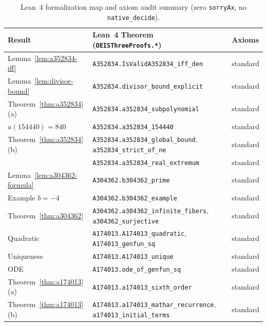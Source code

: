 \documentclass[11pt,a4paper]{article}
\theoremstyle{definition}
\theoremstyle{remark}
\begin{document}
\begin{table}[htbp]
\centering
\caption{Lean~4 formalization map and axiom audit summary (zero \texttt{sorryAx}, no \texttt{native\_decide}).}
\label{tab:lean-audit}
{\footnotesize
\begin{tabular}{@{}lll@{}}
\toprule
Result & Lean~4 Theorem (\texttt{OEISThreeProofs.*}) & Axioms \\
\midrule
Lemma~\ref{lem:a352834-iff} & \texttt{A352834.IsValidA352834\_iff\_den} & standard \\
Lemma~\ref{lem:divisor-bound} & \texttt{A352834.divisor\_bound\_explicit} & standard \\
Theorem~\ref{thm:a352834}(a) & \texttt{A352834.a352834\_subpolynomial} & standard \\
$a(154440)=840$ & \texttt{A352834.a352834\_154440} & standard \\
Theorem~\ref{thm:a352834}(b) & \texttt{A352834.a352834\_global\_bound}, \texttt{a352834\_strict\_of\_ne} & standard \\
 & \texttt{A352834.a352834\_real\_extremum} & standard \\
\midrule
Lemma~\ref{lem:a304362-formula} & \texttt{A304362.b304362\_prime} & standard \\
Example $b=-4$ & \texttt{A304362.b304362\_example} & standard \\
Theorem~\ref{thm:a304362} & \texttt{A304362.a304362\_infinite\_fibers}, \texttt{a304362\_surjective} & standard \\
\midrule
Quadratic & \texttt{A174013.A174013\_quadratic}, \texttt{A174013\_genfun\_sq} & standard \\
Uniqueness & \texttt{A174013.A174013\_unique} & standard \\
ODE & \texttt{A174013.ode\_of\_genfun\_sq} & standard \\
Theorem~\ref{thm:a174013}(a) & \texttt{A174013.a174013\_sixth\_order} & standard \\
Theorem~\ref{thm:a174013}(b) & \texttt{A174013.a174013\_mathar\_recurrence}, \texttt{a174013\_initial\_terms} & standard \\
\bottomrule
\end{tabular}
}
\end{table}
\end{document}
